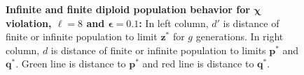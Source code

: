 \begin{figure}[!b]
\begin{center}
\hspace{-3em}%
\vspace{-0.5em}  \hspace{-3em}%

\caption[\textbf{Infinite and finite diploid population behavior for $\bm{\chi}$ violation, $\ell = 8$ and $\bm{\epsilon} = 0.1$}]
{\textbf{Infinite and finite diploid population behavior for $\bm{\chi}$ violation, $\ell = 8$ and $\bm{\epsilon} = 0.1$:} 
In left column, $d'$ is distance of finite or infinite population to limit $\bm{z}^\ast$ for $g$ generations. 
In right column, $d$ is distance of finite or infinite population to limits $\bm{p}^\ast$ and $\bm{q}^\ast$. Green line is distance to $\bm{p}^\ast$ and red line is distance to $\bm{q}^\ast$.}
\label{oscillation_8d_vio_chi_0.1}
\end{center}
\end{figure}

